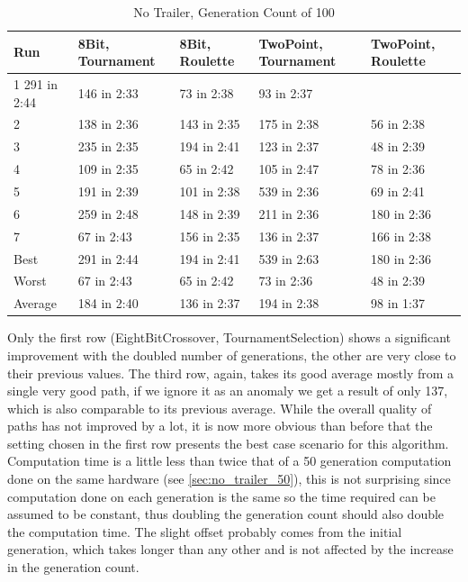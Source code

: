 \begin{table}\caption{No Trailer, Generation Count of 100}
\begin{center}
	\begin{tabular}{| l | l | l | p{3cm} | p{3cm}|}
		\hline
		Run 		& 8Bit, Tournament 	& 8Bit, Roulette 	& TwoPoint, Tournament 	& TwoPoint, Roulette	\\ \hline
		1				291 in 2:44					&	146 in 2:33			&	73 in 2:38						&	93 in 2:37					\\ \hline
		2				&	138 in 2:36				&	143 in 2:35			&	175 in 2:38						&	56 in 2:38					\\ \hline
		3				&	235 in 2:35				&	194 in 2:41			&	123 in 2:37						&	48 in 2:39					\\ \hline
		4				&	109 in 2:35				&	65 in 2:42			&	105 in 2:47						&	78 in 2:36					\\ \hline
		5				&	191 in 2:39				&	101 in 2:38			&	539 in 2:36						&	69 in 2:41					\\ \hline
		6				&	259 in 2:48				&	148 in 2:39			&	211 in 2:36						&	180 in 2:36					\\ \hline
		7				&	67 in 2:43				&	156 in 2:35			&	136 in 2:37						&	166 in 2:38					\\ \hline
		Best		&	291 in 2:44				&	194 in 2:41			&	539 in 2:63						&	180 in 2:36					\\ \hline
		Worst		&	67 in 2:43				&	65 in 2:42			&	73 in 2:36						& 48 in 2:39					\\ \hline
		Average	&	184 in 2:40				& 136 in 2:37			& 194 in 2:38						&	98 in 1:37					\\ \hline
		\hline
	\end{tabular}
\end{center}
\end{table}

Only the first row (EightBitCrossover, TournamentSelection) shows a significant improvement with the doubled number of generations, the other are very close to their previous values. The third row, again, takes its good average mostly from a single very good path, if we ignore it as an anomaly we get a result of only 137, which is also comparable to its previous average. While the overall quality of paths has not improved by a lot, it is now more obvious than before that the setting chosen in the first row presents the best case scenario for this algorithm. Computation time is a little less than twice that of a 50 generation computation done on the same hardware (see \ref{sec:no_trailer_50}), this is not surprising since computation done on each generation is the same so the time required can be assumed to be constant, thus doubling the generation count should also double the computation time. The slight offset probably comes from the initial generation, which takes longer than any other and is not affected by the increase in the generation count.

